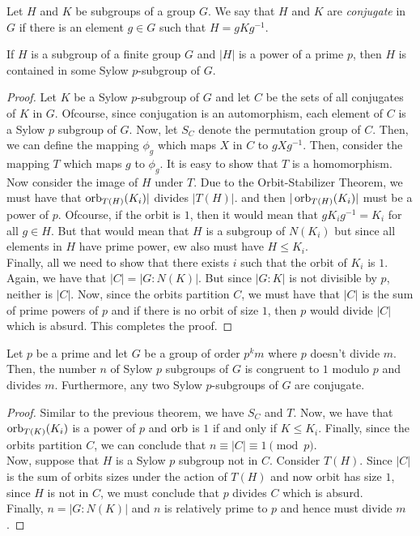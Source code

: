 \begin{definition}
	Let $H$ and $K$ be subgroups of a group $G$. We say that $H$ and $K$ are \textit{conjugate} in $G$ if there is an element $g\in G$ such that $H=gKg^{-1}$.
\end{definition}

\begin{theorem}
	If $H$ is a subgroup of a finite group $G$ and $|H|$ is a power of a prime $p$, then $H$ is contained in some Sylow $p$-subgroup of $G$.
\end{theorem}
\begin{proof}
	Let $K$ be a Sylow $p$-subgroup of $G$ and let $C$ be the sets of all conjugates of $K$ in $G$. Ofcourse, since conjugation is an automorphism, each element of $C$ is a Sylow $p$ subgroup of $G$. Now, let $S_C$ denote the permutation group of $C$. Then, we can define the mapping $\phi_g$ which maps $X$ in $C$ to $gXg^{-1}$. Then, consider the mapping $T$ which maps $g$ to $\phi_g$. It is easy to show that $T$ is a homomorphism.\\
	Now consider the image of $H$ under $T$. Due to the Orbit-Stabilizer Theorem, we must have that $\operatorname{orb}_{T(H)}(K_i)|$ divides $|T(H)|$. and then $|\operatorname{orb}_{T(H)}(K_i)|$ must be a power of $p$. Ofcourse, if the orbit is $1$, then it would mean that $gK_ig^{-1}=K_i$ for all $g\in H$. But that would mean that $H$ is a subgroup of $N(K_i)$ but since all elements in $H$ have prime power, ew also must have $H\le K_i$.\\
	Finally, all we need to show that there exists $i$ such that the orbit of $K_i$ is $1$. Again, we have that $|C| = |G:N(K)|$. But since $|G:K|$ is not divisible by $p$, neither is $|C|$. Now, since the orbits partition $C$, we must have that $|C|$ is the sum of prime powers of $p$ and if there is no orbit of size $1$, then $p$ would divide $|C|$ which is absurd. This completes the proof.
\end{proof}

\begin{theorem}
	Let $p$ be a prime and let $G$ be a group of order $p^km$ where $p$ doesn't divide $m$. Then, the number $n$ of Sylow $p$ subgroups of $G$ is congruent to $1$ modulo $p$ and divides $m$. Furthermore, any two Sylow $p$-subgroups of $G$ are conjugate.
\end{theorem}
\begin{proof}
	Similar to the previous theorem, we have $S_C$ and $T$. Now, we have that $\operatorname{orb}_{T(K)}(K_i)$ is a power of $p$ and $\operatorname{orb}$ is $1$ if and only if $K\le K_i$. Finally, since the orbits partition $C$, we can conclude that $n\equiv |C|\equiv 1\pmod p$.\\
	Now, suppose that $H$ is a Sylow $p$ subgroup not in $C$. Consider $T(H)$. Since $|C|$ is the sum of orbits sizes under the action of $T(H)$ and now orbit has size $1$, since $H$ is not in $C$, we must conclude that $p$ divides $C$ which is absurd.\\
	Finally, $n=|G:N(K)|$ and $n$ is relatively prime to $p$ and hence must divide $m$.
\end{proof}

